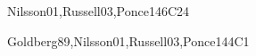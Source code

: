 \begin{syllabus}
\begin{unit}{\ISBasicKnowledgeRepresentationandReasoning}{}{Nilsson01,Russell03,Ponce14}{6}{C24}
\begin{topics}
    \item \ISBasicKnowledgeRepresentationandReasoningTopicReview
    \item \ISBasicKnowledgeRepresentationandReasoningTopicResolution
    \item \ISBasicKnowledgeRepresentationandReasoningTopicForward
    \item \ISBasicKnowledgeRepresentationandReasoningTopicReviewOf
\end{topics}
\begin{learningoutcomes}
    \item \ISBasicKnowledgeRepresentationandReasoningLOTranslate [\Usage]
    \item \ISBasicKnowledgeRepresentationandReasoningLOConvertA [\Usage]
    \item \ISBasicKnowledgeRepresentationandReasoningLOApplyResolution [\Usage]
    \item \ISBasicKnowledgeRepresentationandReasoningLOMake [\Usage]
\end{learningoutcomes}
\end{unit}

\begin{unit}{\ISAdvancedSearch}{}{Goldberg89,Nilsson01,Russell03,Ponce14}{4}{C1}
\begin{topics}
    \item \ISAdvancedSearchTopicConstructing
    \item \ISAdvancedSearchTopicStochastic
    \item \ISAdvancedSearchTopicImplementation
    \item \ISAdvancedSearchTopicMinimax
    \item \ISAdvancedSearchTopicExpectimax
\end{topics}
\begin{learningoutcomes}
    \item \ISAdvancedSearchLODesignAndGenetic [\Usage]
    \item \ISAdvancedSearchLODesignAndSimulated [\Usage]
    \item \ISAdvancedSearchLODesignAndBeam [\Usage]
    \item \ISAdvancedSearchLOApplyMinimax [\Usage]
    \item \ISAdvancedSearchLOCompareAndAlgorithms [\Usage]
    \item \ISAdvancedSearchLOCompareAndHeuristic [\Usage]
\end{learningoutcomes}
\end{unit}


\end{syllabus}
